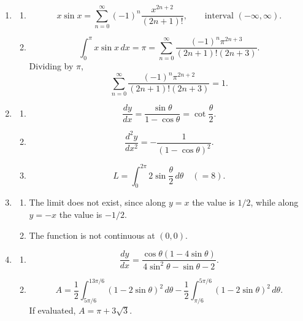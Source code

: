 \documentclass[a4paper,12pt]{article}
\begin{document}
\begin{enumerate}[label=\textbf{\arabic*.},leftmargin=*]
\item
\begin{enumerate}[label=\textbf{(\alph*)},leftmargin=*]
\item
\[
  x\sin x=\sum_{n=0}^{\infty}(-1)^n\frac{x^{2n+2}}{(2n+1)!},
  \qquad \text{interval }(-\infty,\infty).
\]
\item
\[
  \int_0^\pi x\sin x\,dx=\pi
  =
  \sum_{n=0}^{\infty}
  \frac{(-1)^n\pi^{2n+3}}{(2n+1)!(2n+3)}.
\]
Dividing by \(\pi\),
\[
  \boxed{
  \sum_{n=0}^{\infty}
  \frac{(-1)^n\pi^{2n+2}}{(2n+1)!(2n+3)}=1}.
\]
\end{enumerate}

\item
\begin{enumerate}[label=\textbf{(\alph*)},leftmargin=*]
\item
\[
  \boxed{\frac{dy}{dx}=\frac{\sin\theta}{1-\cos\theta}
  =\cot\frac{\theta}{2}}.
\]
\item
\[
  \boxed{\frac{d^2y}{dx^2}
  =-\frac{1}{(1-\cos\theta)^2}}.
\]
\item
\[
  \boxed{
  L=\int_0^{2\pi}2\sin\frac{\theta}{2}\,d\theta}
  \quad(=8).
\]
\end{enumerate}

\item
\begin{enumerate}[label=\textbf{(\alph*)},leftmargin=*]
\item The limit does not exist, since along \(y=x\) the value is \(1/2\), while along \(y=-x\) the value is \(-1/2\).
\item The function is not continuous at \((0,0)\).
\end{enumerate}

\item
\begin{enumerate}[label=\textbf{(\alph*)},leftmargin=*]
\item
\[
  \boxed{
  \frac{dy}{dx}
  =
  \frac{\cos\theta(1-4\sin\theta)}
       {4\sin^2\theta-\sin\theta-2}}.
\]
\item
\[
  \boxed{
  A=
  \frac12\int_{5\pi/6}^{13\pi/6}(1-2\sin\theta)^2\,d\theta
  -
  \frac12\int_{\pi/6}^{5\pi/6}(1-2\sin\theta)^2\,d\theta}.
\]
If evaluated, \(A=\pi+3\sqrt3\).
\end{enumerate}
\end{enumerate}
\end{document}
